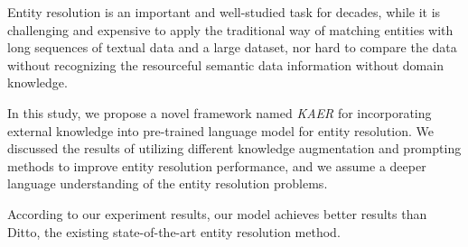 
Entity resolution is an important and well-studied task for decades, while it is challenging and expensive to apply the traditional way of matching entities with long sequences of textual data and a large dataset, nor hard to compare the data without recognizing the resourceful semantic data information without domain knowledge. 

In this study, we propose a novel framework named \textit{KAER} for incorporating external knowledge into pre-trained language model for entity resolution. We discussed the results of utilizing different knowledge augmentation and prompting methods to improve entity resolution performance, and we assume a deeper language understanding of the entity resolution problems. 

According to our experiment results, our model achieves better results than Ditto, the existing state-of-the-art entity resolution method. 

